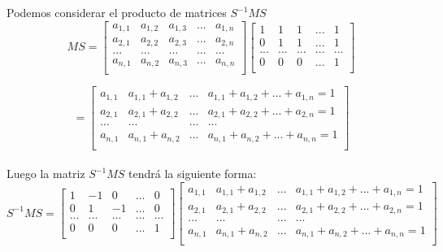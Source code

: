  Podemos considerar el producto de matrices $S^{-1}MS$
   \[ M S = \begin{bmatrix}
   a_{1,1} & a_{1,2} & a_{1,3} &... & a_{1,n} \\
   a_{2,1} & a_{2,2} & a_{2,3} &...  & a_{2,n}\\
   ... & ... & ...& ... & ... \\		
   a_{n,1} & a_{n,2} & a_{n,3} & ... & a_{n,n}\\
   \end{bmatrix} 
   \begin{bmatrix}
   1 & 1 & 1 &... & 1  \\
   0 & 1 & 1 &... & 1 \\
   ... & ... & ...& ... & ... \\	
   0 & 0 & 0 & ... & 1\\
   \end{bmatrix}\]
   
   \[= \begin{bmatrix}
   a_{1,1} & a_{1,1}+a_{1,2} & ... & a_{1,1} + a_{1,2}+...+a_{1,n} = 1  \\
   a_{2,1} & a_{2,1}+a_{2,2} &... & a_{2,1} + a_{2,2}+...+a_{2,n} = 1  \\
   ... & ... & ... & ... \\	
   a_{n,1} & a_{n,1}+a_{n,2} & ... & a_{n,1} + a_{n,2}+...+a_{n,n} = 1 \\
   \end{bmatrix}\]\\
  
  Luego la matriz  $S^{-1}MS$ tendrá la siguiente forma:\\
     \[ S^{-1}MS = \begin{bmatrix}
     1 & -1 & 0 &... & 0 \\
     0 & 1 & -1 &...  & 0\\
     ... & ... & ...& ... & ... \\		
     0 & 0 & 0 & ... & 1\\
     \end{bmatrix} 
     \begin{bmatrix}
     a_{1,1} & a_{1,1}+a_{1,2} & ... & a_{1,1} + a_{1,2}+...+a_{1,n} = 1  \\
     a_{2,1} & a_{2,1}+a_{2,2} &... & a_{2,1} + a_{2,2}+...+a_{2,n} = 1  \\
     ... & ... & ... & ... \\	
     a_{n,1} & a_{n,1}+a_{n,2} & ... & a_{n,1} + a_{n,2}+...+a_{n,n} = 1 \\
     \end{bmatrix}\]
     
